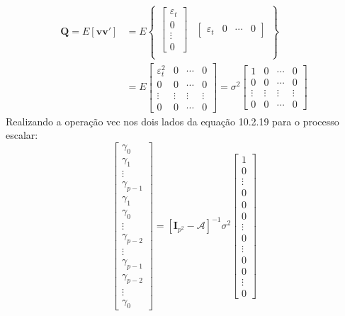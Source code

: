 \begin{enumerate}
\begin{align*}\mathbf{Q}=E[\mathbf{vv}']&=E\begin{Bmatrix}
\begin{bmatrix}
\varepsilon_t\\
0\\
\vdots\\
0
\end{bmatrix}&
\begin{bmatrix}
\varepsilon_t&0&\cdots&0
\end{bmatrix}\\
\end{Bmatrix}\\
&=E\begin{bmatrix}
	\varepsilon_t^2&0&\cdots&0\\
	0&0&\cdots&0\\
	\vdots&\vdots&\vdots&\vdots\\
	0&0&\cdots&0
\end{bmatrix}=\sigma^2\begin{bmatrix}
1&0&\cdots&0\\
0&0&\cdots&0\\
\vdots&\vdots&\vdots&\vdots\\
0&0&\cdots&0
\end{bmatrix}
	\end{align*}	
	Realizando a operação vec nos dois lados da equação  10.2.19 para o processo escalar:
	$$\begin{bmatrix}
	\gamma_0\\
	\gamma_1\\
	\vdots\\
	\gamma_{p-1}\\
	\gamma_1\\
	\gamma_0\\
	\vdots\\
	\gamma_{p-2}\\
	\vdots\\
	\gamma_{p-1}\\
	\gamma_{p-2}\\
	\vdots\\
	\gamma_0
	\end{bmatrix}=[\mathbf{I}_{p^2}-\mathbf{\mathscr{A}}]^{-1}\sigma^2\begin{bmatrix}
	1\\
	0\\
	\vdots\\
	0\\
	0\\
	0\\
	\vdots\\
	0\\
	\vdots\\
	0\\
	0\\
	\vdots\\
	0
	\end{bmatrix}$$
	

\end{enumerate}
